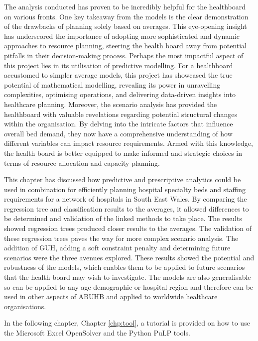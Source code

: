 \documentclass[../thesis.tex]{subfiles}
\begin{document}
The analysis conducted has proven to be incredibly helpful for the healthboard on various fronts. One key takeaway from the models is the clear demonstration of the drawbacks of planning solely based on averages. This eye-opening insight has underscored the importance of adopting more sophisticated and dynamic approaches to resource planning, steering the health board away from potential pitfalls in their decision-making process. Perhaps the most impactful aspect of this project lies in its utilisation of predictive modelling. For a healthboard accustomed to simpler average models, this project has showcased the true potential of mathematical modelling, revealing its power in unravelling complexities, optimising operations, and delivering data-driven insights into healthcare planning. Moreover, the scenario analysis has provided the healthboard with valuable revelations regarding potential structural changes within the organisation. By delving into the intricate factors that influence overall bed demand, they now have a comprehensive understanding of how different variables can impact resource requirements. Armed with this knowledge, the health board is better equipped to make informed and strategic choices in terms of resource allocation and capacity planning.

This chapter has discussed how predictive and prescriptive analytics could be used in combination for efficiently planning hospital specialty beds and staffing requirements for a network of hospitals in South East Wales. By comparing the regression tree and classification results to the averages, it allowed differences to be determined and validation of the linked methods to take place. The results showed regression trees produced closer results to the averages. The validation of these regression trees paves the way for more complex scenario analysis. The addition of GUH, adding a soft constraint penalty and determining future scenarios were the three avenues explored. These results showed the potential and robustness of the models, which enables them to be applied to future scenarios that the health board may wish to investigate. The models are also generalisable so can be applied to any age demographic or hospital region and therefore can be used in other aspects of ABUHB and applied to worldwide healthcare organisations.

In the following chapter, Chapter \ref{chp:tool}, a tutorial is provided on how to use the Microsoft Excel OpenSolver and the Python PuLP tools.
\end{document}
